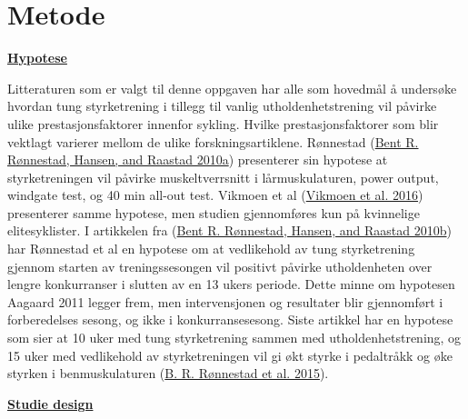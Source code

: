 \documentclass[
]{book}
\begin{document}
\hypertarget{metode-1}{%
\section{Metode}\label{metode-1}}

\underline{\textbf{Hypotese}}

Litteraturen som er valgt til denne oppgaven har alle som hovedmål å
undersøke hvordan tung styrketrening i tillegg til vanlig
utholdenhetstrening vil påvirke ulike prestasjonsfaktorer innenfor
sykling. Hvilke prestasjonsfaktorer som blir vektlagt varierer mellom de
ulike forskningsartiklene. Rønnestad
(\protect\hyperlink{ref-ruxf8nnestad2010b}{Bent R. Rønnestad, Hansen,
and Raastad 2010a}) presenterer sin hypotese at styrketreningen vil
påvirke muskeltverrsnitt i lårmuskulaturen, power output, windgate test,
og 40 min all-out test. Vikmoen et al
(\protect\hyperlink{ref-vikmoen2016}{Vikmoen et al. 2016}) presenterer
samme hypotese, men studien gjennomføres kun på kvinnelige
elitesyklister. I artikkelen fra
(\protect\hyperlink{ref-ruxf8nnestad2010a}{Bent R. Rønnestad, Hansen,
and Raastad 2010b}) har Rønnestad et al en hypotese om at vedlikehold av
tung styrketrening gjennom starten av treningssesongen vil positivt
påvirke utholdenheten over lengre konkurranser i slutten av en 13 ukers
periode. Dette minne om hypotesen Aagaard 2011 legger frem, men
intervensjonen og resultater blir gjennomført i forberedelses sesong, og
ikke i konkurransesesong. Siste artikkel har en hypotese som sier at 10
uker med tung styrketrening sammen med utholdenhetstrening, og 15 uker
med vedlikehold av styrketreningen vil gi økt styrke i pedaltråkk og øke
styrken i benmuskulaturen (\protect\hyperlink{ref-ruxf8nnestad2015}{B.
R. Rønnestad et al. 2015}).

\underline{\textbf{Studie design}}
\end{document}
